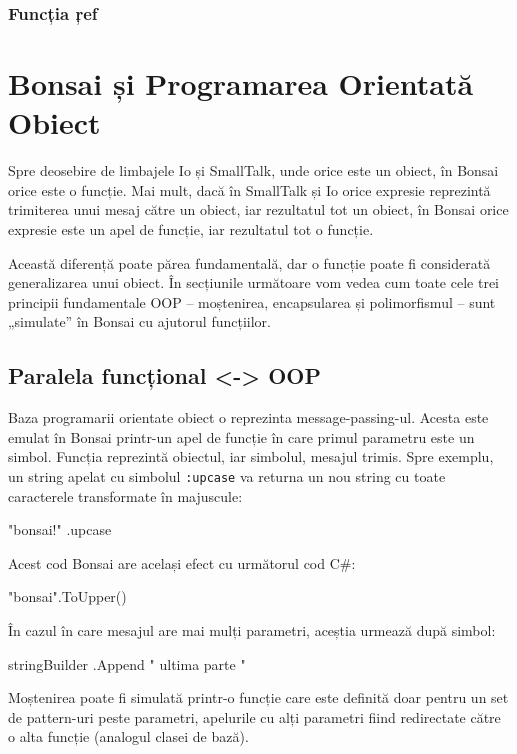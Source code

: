 \documentclass[12pt,a4paper]{memoir}
\begin{document}
\subsection{Funcția \c{ref}}


\chapter{Bonsai și Programarea Orientată Obiect}

Spre deosebire de limbajele Io\cite{io} și SmallTalk\cite{smalltalk}, unde orice este un obiect, în Bonsai orice este o funcție. Mai mult, dacă în SmallTalk și Io orice expresie reprezintă trimiterea unui mesaj către un obiect, iar rezultatul tot un obiect, în Bonsai orice expresie este un apel de funcție, iar rezultatul tot o funcție.

Această diferență poate părea fundamentală, dar o funcție poate fi considerată generalizarea unui obiect. În secțiunile următoare vom vedea cum toate cele trei principii fundamentale OOP – moștenirea, encapsularea și polimorfismul – sunt „simulate” în Bonsai cu ajutorul funcțiilor.

\section{Paralela funcțional <-> OOP}

Baza programarii orientate obiect o reprezinta message-passing-ul. Acesta este emulat în Bonsai printr-un apel de funcție în care primul parametru este un simbol. Funcția reprezintă obiectul, iar simbolul, mesajul trimis. Spre exemplu, un string apelat cu simbolul \texttt{:upcase} va returna un nou string cu toate caracterele transformate în majuscule:
\begin{code}
"bonsai!" .upcase
\end{code}
Acest cod Bonsai are același efect cu următorul cod C\#:
\begin{code}
"bonsai".ToUpper()
\end{code}
În cazul în care mesajul are mai mulți parametri, aceștia urmează după simbol:
\begin{code}
stringBuilder .Append " ultima parte "
\end{code}

Moștenirea poate fi simulată printr-o funcție care este definită doar pentru un set de pattern-uri peste parametri, apelurile cu alți parametri fiind redirectate către o alta funcție (analogul clasei de bază).
\end{document}
